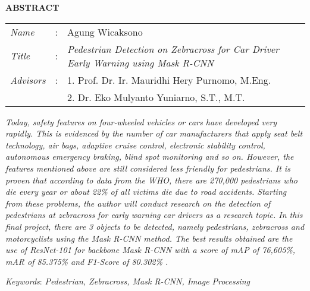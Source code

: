 \begin{center}
  \large\textbf{ABSTRACT}
\end{center}


\vspace{2ex}

\begingroup
  \setlength{\tabcolsep}{0pt}

  \noindent
  \begin{tabularx}{\textwidth}{l >{\centering}m{3em} X}
    \emph{Name}     &:& Agung Wicaksono \\

    \emph{Title}    &:& \emph{Pedestrian Detection on \textit{Zebracross} for Car Driver Early Warning using \textit{Mask R-CNN}} \\

    \emph{Advisors}  &:& 1. Prof. Dr. Ir. Mauridhi Hery Purnomo, M.Eng. \\
    				 & & 2. Dr. Eko Mulyanto Yuniarno, S.T., M.T. \\
  \end{tabularx}
\endgroup

\emph{Today, safety features on four-wheeled vehicles or cars have developed very rapidly. This is evidenced by the number of car manufacturers that apply seat belt technology, air bags, adaptive cruise control, electronic stability control, autonomous emergency braking, blind spot monitoring and so on. However, the features mentioned above are still considered less friendly for pedestrians. It is proven that according to data from the WHO, there are 270,000 pedestrians who die every year or about 22\% of all victims die due to road accidents. Starting from these problems, the author will conduct research on the detection of pedestrians at zebracross for early warning car drivers as a research topic. In this final project, there are 3 objects to be detected, namely pedestrians, zebracross and motorcyclists using the Mask R-CNN method. The best results obtained are the use of \textit{ResNet-101} for \textit{backbone Mask R-CNN} with a score of \textit{mAP} of 76,605\%, mAR of 85.375\% and \textit{F1-Score} of 80.302\% .}

\emph{Keywords}: \emph{Pedestrian, Zebracross, Mask R-CNN, Image Processing}
